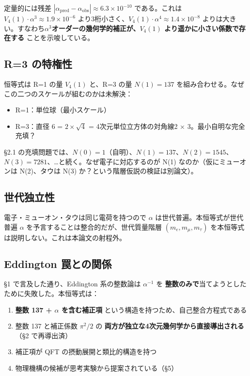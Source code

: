 \documentclass[a4paper,11pt]{ltjsarticle}
\begin{document}
定量的には残差 $|\alpha_{\text{pred}} - \alpha_{\text{obs}}| \approx 6.3 \times 10^{-10}$ である。これは $V_4(1) \cdot \alpha^3 \approx 1.9 \times 10^{-6}$ より3桁小さく、$V_4(1) \cdot \alpha^4 \approx 1.4 \times 10^{-8}$ よりは大きい。すなわち\textbf{$\alpha^3$オーダーの幾何学的補正が、$V_4(1)$ より遥かに小さい係数で存在する} ことを示唆している。

\subsection{R=3 の特権性}

恒等式は R=1 の量 $V_4(1)$ と、R=3 の量 $N(1) = 137$ を組み合わせる。なぜこの二つのスケールが組むのかは未解決：

\begin{itemize}
\item R=1：単位球（最小スケール）
\item R=3：直径 6 = $2 \times \sqrt{4}$ = 4次元単位立方体の対角線2 × 3。最小自明な完全充填？
\end{itemize}

§2.1 の充填問題では、$N(0)=1$（自明）、$N(1)=137$、$N(2)=1545$、$N(3)=7281$、…と続く。なぜ電子に対応するのが N(1) なのか（仮にミューオンは N(2)、タウは N(3) か？という階層仮説の検証は別論文）。

\subsection{世代独立性}

電子・ミューオン・タウは同じ電荷を持つので $\alpha$ は世代普遍。本恒等式が世代普遍 $\alpha$ を予言することは整合的だが、世代質量階層 $(m_e, m_\mu, m_\tau)$ を本恒等式は説明しない。これは本論文の射程外。

\subsection{Eddington 罠との関係}

§1 で言及した通り、Eddington 系の整数論は $\alpha^{-1}$ を \textbf{整数のみで}当てようとしたために失敗した。本恒等式は：

\begin{enumerate}
\item \textbf{整数 137 + $\alpha$ を含む補正項} という構造を持つため、自己整合方程式である
\item 整数 137 と補正係数 $\pi^2/2$ の \textbf{両方が独立な4次元幾何学から直接導出される}（§2 で再導出済）
\item 補正項が QFT の摂動展開と類比的構造を持つ
\item 物理機構の候補が思考実験から提案されている（§5）
\end{enumerate}
\end{document}
